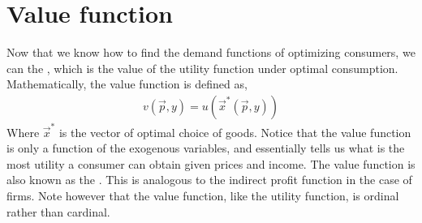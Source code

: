 \section{Value function}
Now that we know how to find the demand functions of optimizing consumers, we can the , which is the value of the utility function under optimal consumption. Mathematically, the value function is defined as,
\begin{align*}
    v(\vec{p}, y) = u(\vec{x}^*(\vec{p}, y))
\end{align*}
Where $\vec{x}^*$ is the vector of optimal choice of goods. Notice that the value function is only a function of the exogenous variables, and essentially tells us what is the most utility a consumer can obtain given prices and income. The value function is also known as the . This is analogous to the indirect profit function in the case of firms. Note however that the value function, like the utility function, is ordinal rather than cardinal. 

